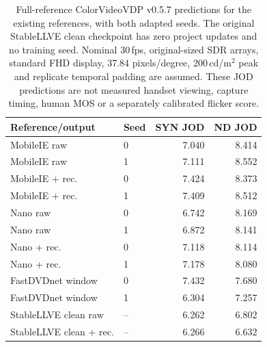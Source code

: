 \begin{table}[t]
\centering\small
\caption{Full-reference ColorVideoVDP v0.5.7 predictions for the existing references, with both adapted seeds. The original StableLLVE clean checkpoint has zero project updates and no training seed. Nominal 30\,fps, original-sized SDR arrays, standard FHD display, 37.84 pixels/degree, 200\,cd/m$^2$ peak and replicate temporal padding are assumed. These JOD predictions are not measured handset viewing, capture timing, human MOS or a separately calibrated flicker score.}
\label{tab:perceptual}
\begin{tabular}{llrr}
\toprule
Reference/output & Seed & SYN JOD & ND JOD\\
\midrule
MobileIE raw & 0 & 7.040 & 8.414\\
MobileIE raw & 1 & 7.111 & 8.552\\
MobileIE + rec. & 0 & 7.424 & 8.373\\
MobileIE + rec. & 1 & 7.409 & 8.512\\
Nano raw & 0 & 6.742 & 8.169\\
Nano raw & 1 & 6.872 & 8.141\\
Nano + rec. & 0 & 7.118 & 8.114\\
Nano + rec. & 1 & 7.178 & 8.080\\
FastDVDnet window & 0 & 7.432 & 7.680\\
FastDVDnet window & 1 & 6.304 & 7.257\\
StableLLVE clean raw & -- & 6.262 & 6.802\\
StableLLVE clean + rec. & -- & 6.266 & 6.632\\
\bottomrule
\end{tabular}
\end{table}
